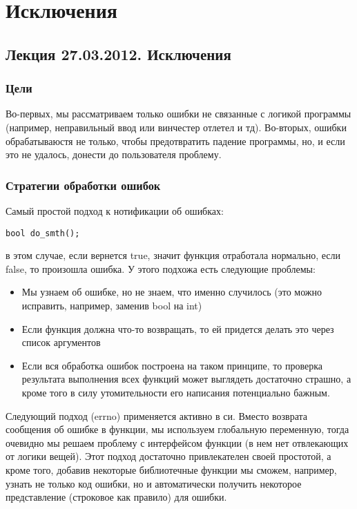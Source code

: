 \chapter{Исключения}

\section{Лекция 27.03.2012. Исключения}

\subsection{Цели}

Во-первых, мы рассматриваем только ошибки не связанные с логикой программы (например, неправильный ввод или винчестер отлетел и тд).
Во-вторых, ошибки обрабатываюстя не только, чтобы предотвратить падение программы, но, и если это не удалось, донести до пользователя
проблему.

\subsection{Стратегии обработки ошибок}

Самый простой подход к нотификации об ошибках:

\begin{lstlisting}
bool do_smth();
\end{lstlisting}

в этом случае, если вернется true, значит функция отработала нормально, если false, то произошла ошибка. У этого подхожа есть следующие
проблемы:
\begin{itemize}
\item Мы узнаем об ошибке, но не знаем, что именно случилось (это можно исправить, например, заменив bool на int)

\item Если функция должна что-то возвращать, то ей придется делать это через список аргументов

\item Если вся обработка ошибок построена на таком принципе, то проверка результата выполнения всех функций может выглядеть достаточно
страшно, а кроме того в силу утомительности его написания потенциально бажным.
\end{itemize}

Следующий подход (errno) применяется активно в си. Вместо возврата сообщения об ошибке в функции, мы используем глобальную переменную,
тогда очевидно мы решаем проблему с интерфейсом функции (в нем нет отвлекающих от логики вещей). Этот подход достаточно привлекателен
своей простотой, а кроме того, добавив некоторые библиотечные функции мы сможем, например, узнать не только код ошибки, но и автоматически
получить некоторое представление (строковое как правило) для ошибки.

